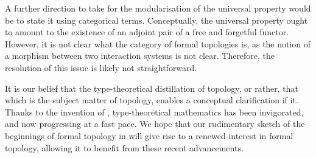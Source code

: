 A further direction to take for the modularisation of the universal property would be to
state it using categorical terms. Conceptually, the universal property ought to amount to
the existence of an adjoint pair of a free and forgetful functor. However, it is not clear
what the category of formal topologies is, as the notion of a morphism between two
interaction systems is not clear. Therefore, the resolution of this issue is likely not
straightforward.

It is our belief that the type-theoretical distillation of topology, or rather, that which
is the subject matter of topology, enables a conceptual clarification if it. Thanks to the
invention of \UF{}, type-theoretical mathematics has been invigorated, and now progressing
at a fast pace. We hope that our rudimentary sketch of the beginnings of formal topology
in \UF{} will give rise to a renewed interest in formal topology, allowing it to benefit
from these recent advancements.
